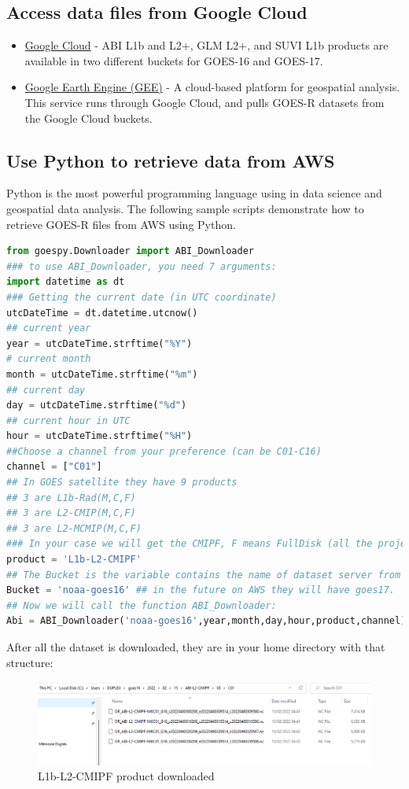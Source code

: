 \subsection{Access data files from Google Cloud}
\begin{itemize}
\item \href{https://console.cloud.google.com/marketplace/product/noaa-public/goes-16?filter=category:science-research&id=5babd633-afa0-4e40-9dba-0587f4aabc47}{Google Cloud} - ABI L1b and L2+, GLM L2+, and SUVI L1b products are available in two different buckets for GOES-16 and GOES-17. 
\item \href{https://developers.google.com/earth-engine}{Google Earth Engine (GEE)} - A cloud-based platform for geospatial analysis. This service runs through 
Google Cloud, and pulls GOES-R datasets from the Google Cloud buckets. 
\end{itemize}
\subsection{Use Python to retrieve data from AWS}
Python is the most powerful programming language using in data science and geospatial data analysis.
The following sample scripts demonstrate how to retrieve GOES-R files from AWS using  Python. 
\begin{lstlisting}[language=Python]
from goespy.Downloader import ABI_Downloader
### to use ABI_Downloader, you need 7 arguments:
import datetime as dt 
### Getting the current date (in UTC coordinate)
utcDateTime = dt.datetime.utcnow() 
## current year
year = utcDateTime.strftime("%Y")
# current month
month = utcDateTime.strftime("%m")
## current day
day = utcDateTime.strftime("%d")
## current hour in UTC 
hour = utcDateTime.strftime("%H")
##Choose a channel from your preference (can be C01-C16)
channel = ["C01"]
## In GOES satellite they have 9 products
## 3 are L1b-Rad(M,C,F)
## 3 are L2-CMIP(M,C,F)
## 3 are L2-MCMIP(M,C,F)
### In your case we will get the CMIPF, F means FullDisk (all the projection by the satellite)
product = 'L1b-L2-CMIPF'
## The Bucket is the variable contains the name of dataset server from goes on AWS
Bucket = 'noaa-goes16' ## in the future on AWS they will have goes17.
## Now we will call the function ABI_Downloader:
Abi = ABI_Downloader('noaa-goes16',year,month,day,hour,product,channel)
\end{lstlisting}
After all the dataset is downloaded, they are in your home directory with that structure:
\begin{figure}[H]
\begin{center}
\includegraphics[scale=0.8]{file1.png} %
\end{center}
\caption{L1b-L2-CMIPF product downloaded}
\label{L1b-L2-CMIPF product downloaded}%
\end{figure}
